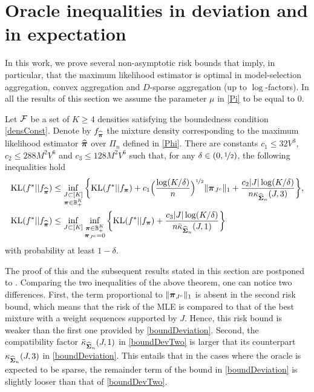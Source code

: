 \section{Oracle inequalities in deviation and in expectation} %
\label{sec:main_results}

In this work, we prove several non-asymptotic risk bounds that
imply, in particular, that the maximum likelihood estimator is optimal in model-selection aggregation,
convex aggregation and $D$-sparse aggregation (up to $\log$-factors). In all the results of this section
we assume the parameter $\mu$ in \eqref{Pi} to be equal to $0$.
\begin{theorem}
	\label{maintheo1}
	Let $\cal F$ be a set of $K\ge 4$ densities satisfying the boundedness condition \eqref{densConst}.
	Denote by $f_{\widehat{\boldsymbol \pi}}$ the mixture density corresponding to the maximum likelihood estimator
	$\widehat{\boldsymbol \pi}$ over $\Pi_n$ defined in \eqref{Phi}. There are constants $c_1\le 32V^3$,
	$c_2\le 288 M^2V^6$ and $c_3\le 128 M^2V^6$ such that, for any $\delta \in (0,\nicefrac12)$, the following
	inequalities hold
	\begin{align}
	{\rm KL}(f^*|| f_{\widehat{\boldsymbol \pi}}) &\leq \inf_{\substack{J\subset [K]\\\boldsymbol \pi \in {\mathbb B}_+^K}}
	\bigg\{ {\rm KL}(f^*|| f_{\boldsymbol \pi}) + c_1\Big(\frac{\log(K/\delta)}{n}\Big)^{\nicefrac12} \|\boldsymbol \pi_{J^c}\|_1 +
	\frac{c_2|J|\log(K/\delta)}{n\kappa_{\widehat{\boldsymbol\Sigma}_n}(J,3)} \bigg\},\label{boundDeviation}\\
	{\rm KL}(f^*|| f_{\widehat{\boldsymbol \pi}}) &\leq \inf_{J\subset [K]}\inf_{\substack{\boldsymbol \pi \in {\mathbb B}_+^K\\ \boldsymbol \pi_{J^c}=0}}
	\bigg\{ {\rm KL}(f^*|| f_{\boldsymbol \pi}) +\frac{c_3|J|\log(K/\delta)}{n\bar\kappa_{\widehat{\boldsymbol\Sigma}_n}(J,1)}
	\bigg\} \label{boundDevTwo}
	\end{align}
	with probability at least $1-\delta$.
\end{theorem}

The proof of this and the subsequent results stated in this section are postponed to .
Comparing the two inequalities of the above theorem, one can notice two differences. First, the term
proportional to $\|\boldsymbol \pi_{J^c}\|_1$  is absent in the second risk bound, which means that
the risk of the MLE is compared to that of the best mixture with a weight sequences supported by $J$.
Hence, this risk bound is weaker than the first one provided by \eqref{boundDeviation}. Second,
the compatibility factor $\bar\kappa_{\widehat{\boldsymbol\Sigma}_n}(J,1)$ in \eqref{boundDevTwo} is larger that
its counterpart $\kappa_{\widehat{\boldsymbol\Sigma}_n}(J,3)$ in \eqref{boundDeviation}. This entails that in the cases
where the oracle is expected to be sparse, the remainder term of the bound in \eqref{boundDeviation}
is slightly looser than that of \eqref{boundDevTwo}.


